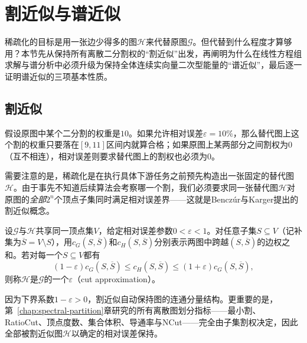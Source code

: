 \section{割近似与谱近似}
\label{sec:graph-sparsification-approximation}

稀疏化的目标是用一张边少得多的图$\mathcal H$来代替原图$\mathcal G$。但代替到什么程度才算够用？本节先从保持所有离散二分割权的“割近似”出发，再阐明为什么在线性方程组求解与谱分析中必须升级为保持全体连续实向量二次型能量的“谱近似”，最后逐一证明谱近似的三项基本性质。

\subsection{割近似}
\label{sec:graph-cut-approximation}

假设原图中某个二分割的权重是$10$。如果允许相对误差$\varepsilon=10\%$，那么替代图上这个割的权重只要落在$[9,11]$区间内就算合格；如果原图上某两部分之间割权为$0$（互不相连），相对误差则要求替代图上的割权也必须为$0$。

需要注意的是，稀疏化是在执行具体下游任务之前预先构造出一张固定的替代图$\mathcal H$。由于事先不知道后续算法会考察哪一个割，我们必须要求同一张替代图$\mathcal H$对原图的\emph{全部}$2^n$个顶点子集同时满足相对误差界——这就是Bencz\'ur与Karger提出的割近似概念。

\begin{definition}[割近似]
\label{def:graph-cut-approximation}
设$\mathcal G$与$\mathcal H$共享同一顶点集$V$，给定相对误差参数$0<\varepsilon<1$。对任意子集$S\subseteq V$（记补集为$\overline S=V\setminus S$），用$c_G(S,\overline S)$和$c_H(S,\overline S)$分别表示两图中跨越$(S,\overline S)$的边权之和。若对每一个$S\subseteq V$都有
\begin{equation}
(1-\varepsilon)c_G(S,\overline S)
\leq c_H(S,\overline S)
\leq (1+\varepsilon)c_G(S,\overline S),
\label{eq:graph-cut-approximation}
\end{equation}
则称$\mathcal H$是$\mathcal G$的一个$\varepsilon$（cut approximation）。
\end{definition}

因为下界系数$1-\varepsilon>0$，割近似自动保持图的连通分量结构。更重要的是，第~\ref{chap:spectral-partition}章研究的所有离散图划分指标——最小割、RatioCut、顶点度数、集合体积、导通率与NCut——完全由子集割权决定，因此全部被割近似图$\mathcal H$以确定的相对误差保持。

